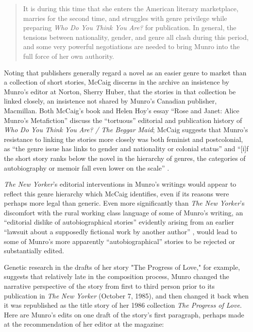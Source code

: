 \documentclass{article}
\begin{document}
\begin{quote}
It is during this time that she enters the American literary marketplace, marries for
the second time, and struggles with genre privilege while preparing \emph{Who Do You Think You Are?} for publication. In general, the tensions between nationality, gender, and genre all clash during this period, and some very powerful negotiations are needed to bring Munro into the full force of her own authority. 

\begin{flushright}
    \parencite[13--14]{mccaig_reading_2002}
\end{flushright}
\end{quote}

Noting that publishers generally regard a novel as an easier genre to
market than a collection of short stories, McCaig discerns in the
archive an insistence by Munro's editor at Norton, Sherry Huber, that
the stories in that collection be linked closely, an insistence not
shared by Munro's Canadian publisher, Macmillan. Both McCaig's book and
Helen Hoy's essay ``Rose and Janet: Alice Munro's Metafiction'' discuss
the ``tortuous'' \citep[69]{hoy_rose_1989} editorial and publication history of \emph{Who
Do You Think You Are? / The Beggar Maid}; McCaig suggests that Munro's
resistance to linking the stories more closely was both feminist and
postcolonial, as ``the genre issue has links to gender and nationality
or colonial status'' and ``{[}i{]}f the short story ranks below the
novel in the hierarchy of genres, the categories of autobiography or
memoir fall even lower on the scale'' \citep[122]{mccaig_reading_2002}.

\emph{The New Yorker}'s editorial interventions in Munro's writings
would appear to reflect this genre hierarchy which McCaig identifies,
even if its reasons were perhaps more legal than generic. Even more
significantly than \emph{The New Yorker}'s discomfort with the rural
working class language of some of Munro's writing, an ``editorial
dislike of autobiographical stories'' evidently arising from an earlier
``lawsuit about a supposedly fictional work by another author'' \citep[207]{beran_luxury_1998},
would lead to some of Munro's more apparently ``autobiographical''
stories to be rejected or substantially edited. 

Genetic research in the drafts of her story "The Progress of Love," for example, suggests that relatively late in the composition process, Munro changed the narrative perspective of the story from first to third person prior to its publication in \emph{The New Yorker} (October 7, 1985), and then changed it back when it was republished as the title story of her 1986 collection \emph{The Progress of Love}. Here are Munro's edits on one draft of the story's first paragraph, perhaps made at the recommendation of her editor at the magazine:
\end{document}
